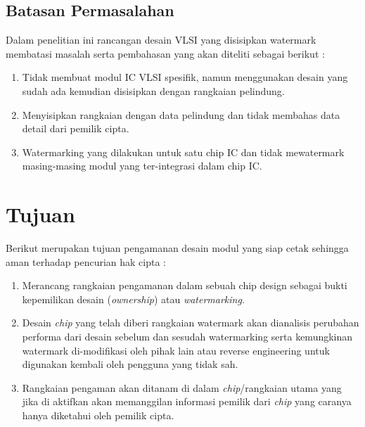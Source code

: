 \subsection{Batasan Permasalahan}
Dalam penelitian ini rancangan desain VLSI yang disisipkan watermark membatasi masalah serta pembahasan yang akan diteliti sebagai berikut :

\begin{enumerate}
	\item Tidak membuat modul IC VLSI spesifik, namun menggunakan desain yang sudah ada kemudian disisipkan dengan rangkaian pelindung.
	
	\item Menyisipkan rangkaian dengan data pelindung dan tidak membahas data detail dari pemilik cipta.
	
	\item Watermarking yang dilakukan untuk satu chip IC dan tidak mewatermark masing-masing modul yang ter-integrasi dalam chip IC. 
\end{enumerate}

% 

\section{Tujuan}
Berikut merupakan tujuan pengamanan desain modul yang siap cetak sehingga aman terhadap pencurian hak cipta :
\begin{enumerate}
	\item Merancang rangkaian pengamanan dalam sebuah chip design sebagai bukti kepemilikan desain (\textit{ownership}) atau \textit{watermarking}.
	
	\item Desain \textit{chip} yang telah diberi rangkaian watermark akan dianalisis perubahan performa dari desain sebelum dan sesudah watermarking serta kemungkinan watermark di-modifikasi oleh pihak lain atau reverse engineering untuk digunakan kembali oleh pengguna yang tidak	sah.
	
	\item Rangkaian pengaman akan ditanam di dalam \textit{chip}/rangkaian utama yang jika di aktifkan akan memanggilan informasi pemilik dari \textit{chip} yang caranya hanya diketahui oleh pemilik cipta.
\end{enumerate}

% 

